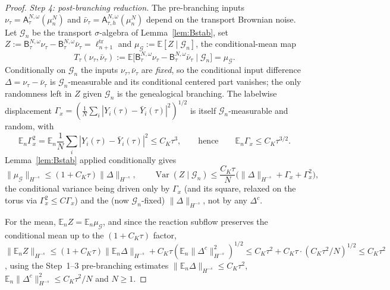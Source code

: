 \documentclass[a4paper,fleqn]{cas-sc}
\theoremstyle{definition}
\theoremstyle{remark}
\begin{document}
\begin{proof}
\emph{Step 4: post-branching reduction.} The pre-branching inputs
$\nu_\tau=\mathsf A^{N,\omega}_\tau(\mu^N_n)$ and
$\bar\nu_\tau=\mathsf A^{N,\omega}_{\tau,h}(\mu^N_n)$ depend on the transport
Brownian noise. Let $\mathcal G_n$ be the transport $\sigma$-algebra of
Lemma~\ref{lem:Bstab}, set $Z:=\mathsf B^{N,\omega}_\tau\nu_\tau
-\mathsf B^{N,\omega}_\tau\bar\nu_\tau=\ell^{\mathrm{tr}}_{n+1}$ and
$\mu_{\mathcal G}:=\mathbb E[Z\mid\mathcal G_n]$, the conditional-mean map
\[
T_\tau(\nu_\tau,\bar\nu_\tau):=\mathbb E\bigl[\mathsf B^{N,\omega}_\tau\nu_\tau
-\mathsf B^{N,\omega}_\tau\bar\nu_\tau\mid\mathcal G_n\bigr]=\mu_{\mathcal G}.
\]
Conditionally on $\mathcal G_n$ the inputs $\nu_\tau,\bar\nu_\tau$ are \emph{fixed},
so the conditional input difference $\Delta=\nu_\tau-\bar\nu_\tau$ is
$\mathcal G_n$-measurable and its conditional centered part vanishes; the only
randomness left in $Z$ given $\mathcal G_n$ is the genealogical branching. The
labelwise displacement $\Gamma_x=(\frac1N\sum_i|Y_i(\tau)-\bar Y_i(\tau)|^2)^{1/2}$
is itself $\mathcal G_n$-measurable and random, with
\begin{equation}\label{eq:Gamma-bound}
\mathbb E_n\Gamma_x^2=\mathbb E_n\frac1N\sum_i|Y_i(\tau)-\bar Y_i(\tau)|^2\le C_K\tau^3,
\qquad\text{hence}\qquad \mathbb E_n\Gamma_x\le C_K\tau^{3/2}.
\end{equation}
Lemma~\ref{lem:Bstab} applied conditionally gives
\[
\|\mu_{\mathcal G}\|_{H^{-s}}\le(1+C_K\tau)\|\Delta\|_{H^{-s}},
\qquad
\operatorname{Var}(Z\mid\mathcal G_n)\le\frac{C_K\tau}{N}\bigl(\|\Delta\|_{H^{-s}}+\Gamma_x+\Gamma_x^2\bigr),
\]
the conditional variance being driven only by $\Gamma_x$ (and its square, relaxed
on the torus via $\Gamma_x^2\le C\Gamma_x$) and the (now $\mathcal G_n$-fixed)
$\|\Delta\|_{H^{-s}}$, not by any $\Delta^c$.

For the mean, $\mathbb E_n Z=\mathbb E_n\mu_{\mathcal G}$, and since the reaction
subflow preserves the conditional mean up to the $(1+C_K\tau)$ factor,
$\|\mathbb E_nZ\|_{H^{-s}}\le(1+C_K\tau)\|\mathbb E_n\Delta\|_{H^{-s}}
+C_K\tau(\mathbb E_n\|\Delta^c\|_{H^{-s}}^2)^{1/2}\le C_K\tau^2+C_K\tau\cdot
(C_K\tau^2/N)^{1/2}\le C_K\tau^2$, using the Step~1--3 pre-branching estimates
$\|\mathbb E_n\Delta\|_{H^{-s}}\le C_K\tau^2$, $\mathbb E_n\|\Delta^c\|_{H^{-s}}^2
\le C_K\tau^2/N$ and $N\ge1$.


\end{proof}
\end{document}
